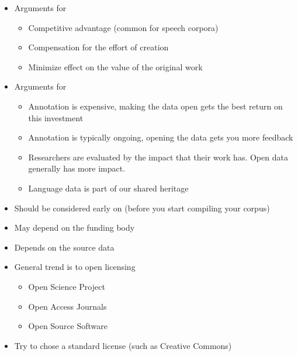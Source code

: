 \documentclass[a4paper,landscape,headrule,footrule,dvips]{foils}
\begin{document}
\begin{CJK}{UTF8}{min}
\MyLogo{}
\begin{itemize}
\item Arguments for 
  \begin{itemize}
  \item Competitive advantage (common for speech corpora)
  \item Compensation for the effort of creation
  \item Minimize effect on the value of the original work
  \end{itemize}
\item Arguments for 
  \begin{itemize}
  \item Annotation is expensive, making the data open gets the best
    return on this investment
  \item Annotation is typically ongoing, opening the data gets you
    more feedback
 \item Researchers are evaluated by the impact that their work has.
   Open data generally has more impact.
  \item Language data is part of our shared heritage
  \end{itemize}
\end{itemize}

\begin{itemize}
\item Should be considered early on (before you start compiling your corpus)
\item May depend on the funding body
\item Depends on the source data
\item General trend is to open licensing
  \begin{itemize}
  \item Open Science Project
  \item Open Access Journals
  \item Open Source Software
  \end{itemize}
\item Try to chose a standard license (such as Creative Commons)

\end{itemize}


\end{CJK}
\end{document}
